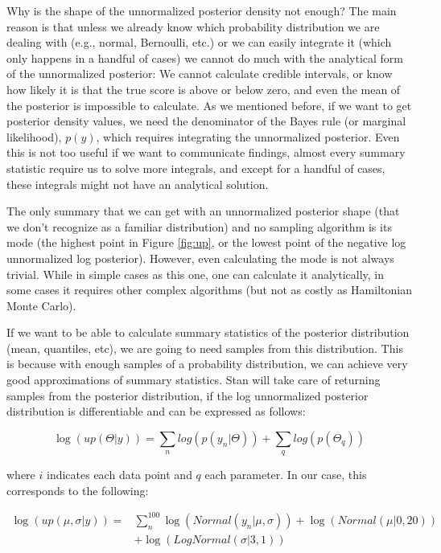 \documentclass[12pt,]{krantz}
\theoremstyle{definition}
\theoremstyle{definition}
\theoremstyle{definition}
\theoremstyle{remark}
\begin{document}
Why is the shape of the unnormalized posterior density not enough? The
main reason is that unless we already know which probability
distribution we are dealing with (e.g., normal, Bernoulli, etc.) or we
can easily integrate it (which only happens in a handful of cases) we
cannot do much with the analytical form of the unnormalized posterior:
We cannot calculate credible intervals, or know how likely it is that
the true score is above or below zero, and even the mean of the
posterior is impossible to calculate. As we mentioned before, if we want
to get posterior density values, we need the denominator of the Bayes
rule (or marginal likelihood), \(p(y)\), which requires integrating the
unnormalized posterior. Even this is not too useful if we want to
communicate findings, almost every summary statistic require us to solve
more integrals, and except for a handful of cases, these integrals might
not have an analytical solution.

The only summary that we can get with an unnormalized posterior shape
(that we don't recognize as a familiar distribution) and no sampling
algorithm is its mode (the highest point in Figure \ref{fig:up}, or the
lowest point of the negative log unnormalized log posterior). However,
even calculating the mode is not always trivial. While in simple cases
as this one, one can calculate it analytically, in some cases it
requires other complex algorithms (but not as costly as Hamiltonian
Monte Carlo).

If we want to be able to calculate summary statistics of the posterior
distribution (mean, quantiles, etc), we are going to need samples from
this distribution. This is because with enough samples of a probability
distribution, we can achieve very good approximations of summary
statistics. Stan will take care of returning samples from the posterior
distribution, if the log unnormalized posterior distribution is
differentiable and can be expressed as follows:

\begin{equation}
\log(up(\Theta|y)) = \sum_n log(p(y_n|\Theta)) + \sum_q log(p(\Theta_q))
\label{eq:logup}
\end{equation}

where \(i\) indicates each data point and \(q\) each parameter. In our
case, this corresponds to the following:

\begin{equation}
\begin{aligned}
\log(up(\mu, \sigma |y)) =& \sum_n^{100} \log(Normal(y_n|\mu, \sigma)) + \log(Normal(\mu | 0, 20)) \\
&+ \log(LogNormal(\sigma | 3, 1)) 
\end{aligned}
\label{eq:up-applied}
\end{equation}
\end{document}
